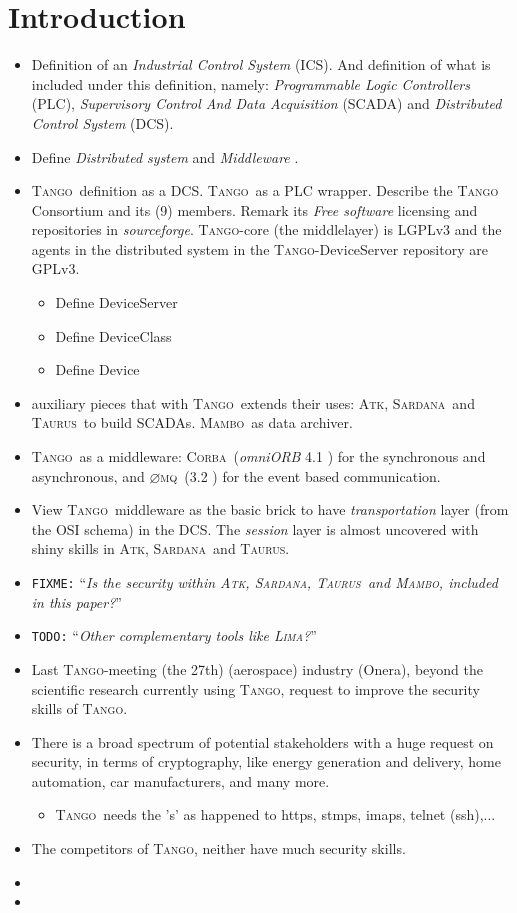 \documentclass[10pt,a4paper,twoside]{llncs}
\newcommand{\todo}[1]{\texttt{\color{red}TODO:} ``\emph{#1}''}
\newcommand{\fixme}[1]{\texttt{\color{red}FIXME:} ``\emph{#1}''}
\newcommand{\tango}{\textsc{Tango}}
\newcommand{\sardana}{\textsc{Sardana}}
\newcommand{\taurus}{\textsc{Taurus}}
\newcommand{\atk}{\textsc{Atk}}
\newcommand{\zmq}{\textsc{$\varnothing$mq}}
\newcommand{\corba}{\textsc{Corba}}
\newcommand{\mambo}{\textsc{Mambo}}
\newcommand{\lima}{\textsc{Lima}}
\begin{document}
\section{Introduction \label{sec:introduction}}


\begin{itemize}
    \item Definition of an \emph{Industrial Control System} (ICS). And definition of what is included under this definition, namely: \emph{Programmable Logic Controllers} (PLC), \emph{Supervisory Control And Data Acquisition} (SCADA) and \emph{Distributed Control System} (DCS).
    \item Define \emph{Distributed system} and \emph{Middleware} \cite{TanenbaumDistr}.
    \item \tango\, definition as a DCS. \tango\, as a PLC wrapper. Describe the \tango\, Consortium and its (9) members. Remark its \emph{Free software} licensing and repositories in \emph{sourceforge}. \tango-core (the middlelayer) is LGPLv3 and the agents in the distributed system in the \tango-DeviceServer repository are GPLv3.
    \begin{itemize}
        \item Define DeviceServer
        \item Define DeviceClass
        \item Define Device
    \end{itemize}
    \item auxiliary pieces that with \tango\, extends their uses: \atk, \sardana\, and \taurus\, to build SCADAs. \mambo\, as data archiver.
    \item \tango\, as a middleware: \corba\, (\emph{omniORB} 4.1 \cite{omniORB41}) for the synchronous and asynchronous, and \zmq\, (3.2 \cite{zmq32}) for the event based communication.
    \item View \tango\, middleware as the basic brick to have \emph{transportation} layer (from the OSI schema) in the DCS. The \emph{session} layer is almost uncovered with shiny skills in \atk, \sardana\, and \taurus.
    \item \fixme{Is the security within \atk, \sardana, \taurus\, and \mambo, included in this paper?}
    \item \todo{Other complementary tools like \lima?}
    \item Last \tango-meeting (the 27th) (aerospace) industry (Onera), beyond the scientific research currently using \tango, request to improve the security skills of \tango.
    \item There is a broad spectrum of potential stakeholders with a huge request on security, in terms of cryptography, like energy generation and delivery, home automation, car manufacturers, and many more.
    \begin{itemize}
        \item \tango\, needs the 's' as happened to https, stmps, imaps, telnet (ssh),...
    \end{itemize}
    \item The competitors of \tango, neither have much security skills.
    \item
    \item
\end{itemize}
\end{document}
